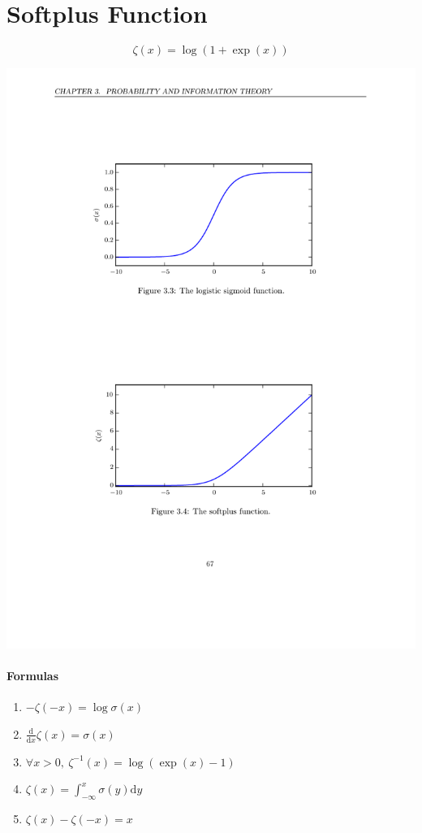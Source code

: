 \documentclass[12pt, a4paper]{article}
\newcommand{\dx}[1]{\frac{\mathrm{d}}{\mathrm{d}x} #1}
\begin{document}
\section{Softplus Function}
\begin{minipage}[c]{0.4\linewidth}
    \[
        \zeta(x) = \log (1 + \exp(x))
    \]
\end{minipage}
\hfill
\begin{minipage}[c]{0.6\linewidth}
    \includegraphics[width=\textwidth]{../imgs/Softplus_Function.pdf}
\end{minipage}
\paragraph{Formulas}
\begin{enumerate}
    \item $\displaystyle - \zeta(-x) = \log \sigma(x)$
    \item $\displaystyle \dx{\zeta(x)} = \sigma(x)$
    \item $\displaystyle \forall x > 0,\ \zeta^{-1}(x) = \log (\exp(x) - 1)$
    \item $\displaystyle \zeta(x) = \int_{-\infty}^x \sigma(y) \mathrm{d}y$
    \item $\displaystyle \zeta(x) - \zeta(-x) = x$
\end{enumerate}
\end{document}
